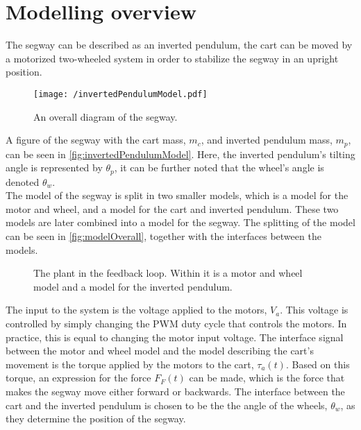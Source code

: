 \section{Modelling overview \label{sec:modelover}}
The segway can be described as an inverted pendulum, the cart can be moved by a motorized two-wheeled system in order to stabilize the segway in an upright position. 
\begin{figure}[H]
\centering
\texttt{[image: /invertedPendulumModel.pdf]}
\caption{An overall diagram of the segway.}
\label{fig:invertedPendulumModel}
\end{figure}
\vspace{-2em}
A figure of the segway with the cart mass, $m_c$, and inverted pendulum mass, $m_p$, can be seen in \autoref{fig:invertedPendulumModel}. Here, the inverted pendulum's tilting angle is represented by $\theta_p$, it can be further noted that the wheel's angle is denoted $\theta_w$.\\
The model of the segway is split in two smaller models, which is a model for the motor and wheel, and a model for the cart and inverted pendulum. These two models are later combined into a model for the segway. The splitting of the model can be seen in \autoref{fig:modelOverall}, together with the interfaces between the models.
\begin{figure}[H]
\centering

\caption{The plant in the feedback loop. Within it is a motor and wheel model and a model for the inverted pendulum.}
\label{fig:modelOverall}
\end{figure}
\vspace{-2em}
The input to the system is the voltage applied to the motors, $V_a$. This voltage is controlled by simply changing the PWM duty cycle that controls the motors. In practice, this is equal to changing the motor input voltage. The interface signal between the motor and wheel model and the model describing the cart's movement is the torque applied by the motors to the cart, $\tau_a(t)$. Based on this torque, an expression for the force $F_F(t)$ can be made, which is the force that makes the segway move either forward or backwards.
The interface between the cart and the inverted pendulum is chosen to be the the angle of the wheels, $\theta_w$, as they determine the position of the segway. %
